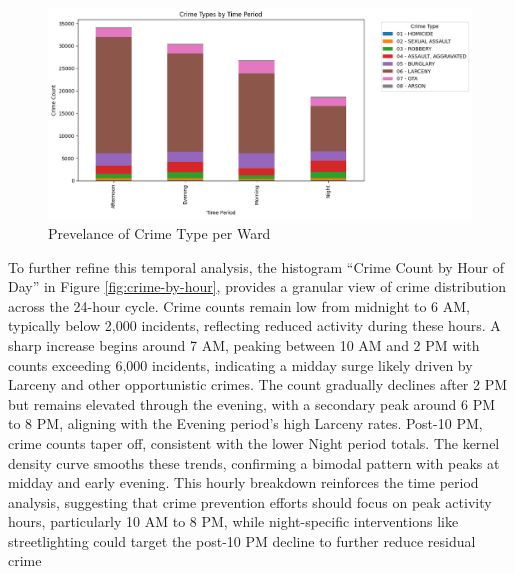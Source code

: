 \documentclass{report}
\begin{document}
    
   \newpage
   \begin{figure}[h]
   	\begin{center}
   		\advance\leftskip-3cm
   		\advance\rightskip-3cm
   		\includegraphics[keepaspectratio=true,scale=.6]{crime-types-by-time}
   		\caption{Prevelance of Crime Type per Ward}
   		\label{fig:crime-type-by-time}
   	\end{center}
   \end{figure}
        
         
    \par To further refine this temporal analysis, the histogram “Crime Count by Hour of Day” in Figure \ref{fig:crime-by-hour}, provides a granular view of crime distribution across the 24-hour cycle. Crime counts remain low from midnight to 6 AM, typically below 2,000 incidents, reflecting reduced activity during these hours. A sharp increase begins around 7 AM, peaking between 10 AM and 2 PM with counts exceeding 6,000 incidents, indicating a midday surge likely driven by Larceny and other opportunistic crimes. The count gradually declines after 2 PM but remains elevated through the evening, with a secondary peak around 6 PM to 8 PM, aligning with the Evening period’s high Larceny rates. Post-10 PM, crime counts taper off, consistent with the lower Night period totals. The kernel density curve smooths these trends, confirming a bimodal pattern with peaks at midday and early evening. This hourly breakdown reinforces the time period analysis, suggesting that crime prevention efforts should focus on peak activity hours, particularly 10 AM to 8 PM, while night-specific interventions like streetlighting could target the post-10 PM decline to further reduce residual crime
    
\end{document}

